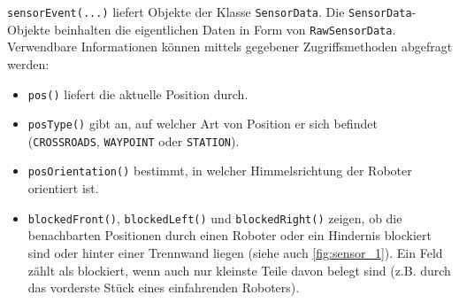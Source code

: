 \texttt{sensorEvent(...)} liefert Objekte der Klasse \texttt{SensorData}. Die \texttt{SensorData}-Objekte beinhalten die eigentlichen Daten in Form von \texttt{RawSensorData}. Verwendbare Informationen können mittels gegebener Zugriffsmethoden abgefragt werden:
\begin{itemize}
	\setlength\topsep{-1em}
	\setlength\itemsep{-0.5em}
 	\item \texttt{pos()} liefert die aktuelle Position durch.
 	\item \texttt{posType()} gibt an, auf welcher Art von Position er sich befindet (\texttt{CROSSROADS}, \texttt{WAYPOINT} oder \texttt{STATION}).
 	\item \texttt{posOrientation()} bestimmt, in welcher Himmelsrichtung der Roboter orientiert ist.
 	\item \texttt{blockedFront()}, \texttt{blockedLeft()} und \texttt{blockedRight()} zeigen, ob die benachbarten Positionen durch einen Roboter oder ein Hindernis blockiert sind oder hinter einer Trennwand liegen (siehe auch \autoref{fig:sensor_1}). Ein Feld zählt als blockiert, wenn auch nur kleinste Teile davon belegt sind (z.B. durch das vorderste Stück eines einfahrenden Roboters).
\end{itemize}

